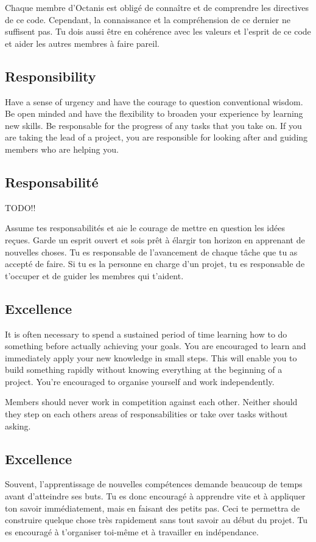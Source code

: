 	Chaque membre d'Octanis est obligé de connaître et de comprendre les directives de ce code.
	Cependant, la connaissance et la compréhension de ce dernier ne suffisent pas. Tu dois aussi être en cohérence avec les valeurs et l'esprit de ce code et aider les autres membres à faire pareil.



	
\english
	\subsection{Responsibility}
	Have a sense of urgency and have the courage to question conventional wisdom. Be open minded and have the flexibility to broaden your experience by learning new skills. Be responsable for the progress of any tasks that you take on. If you are taking the lead of a project, you are responsible for looking after and guiding members who are helping you.



\french
	\subsection{Responsabilité}

	TODO!!

	Assume tes responsabilités et aie le courage de mettre en question les idées reçues. Garde un esprit ouvert et sois prêt à élargir ton horizon en apprenant de nouvelles choses. Tu es responsable de l'avancement de chaque tâche que tu as accepté de faire. Si tu es la personne en charge d'un projet, tu es responsable de t'occuper et de guider les membres qui t'aident. 

\english
	\subsection{Excellence}
 	It is often necessary to spend a sustained period of time learning how to do something before actually achieving your goals. You are encouraged to learn and immediately apply your new knowledge in small steps. This will enable you to build something rapidly without knowing everything at the beginning of a project. You're encouraged to organise yourself and work independently. 
 	

	Members should never work in competition against each other. Neither should they step on each others areas of responsabilities or take over tasks without asking.




\french
	\subsection{Excellence}
	Souvent, l'apprentissage de nouvelles compétences demande beaucoup de temps avant d'atteindre ses buts. Tu es donc encouragé à apprendre vite et à appliquer ton savoir immédiatement, mais en faisant des petits pas. Ceci te permettra de construire quelque chose très rapidement sans tout savoir au début du projet. Tu es encouragé à t'organiser toi-même et à travailler en indépendance. 

